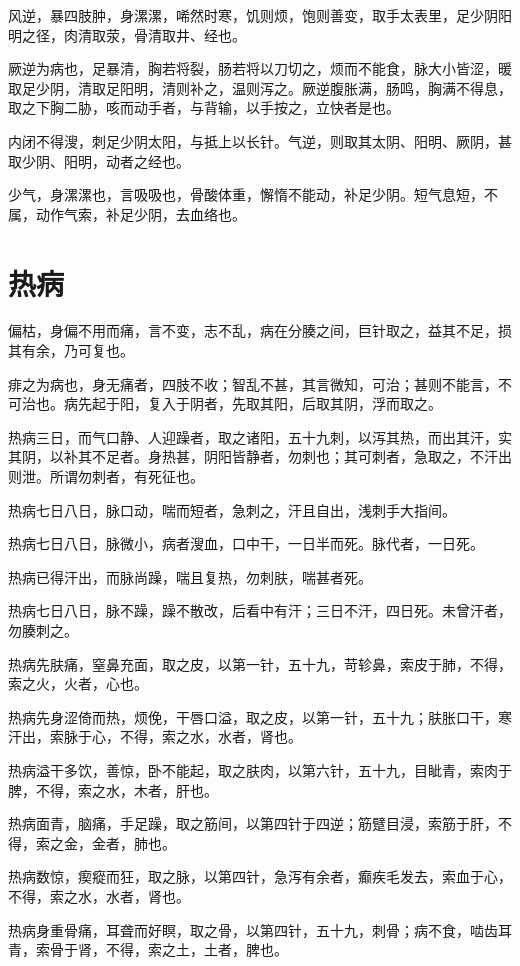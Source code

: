 \documentclass[12pt,UTF8]{ctexbook}
\begin{document}
	风逆，暴四肢肿，身漯漯，唏然时寒，饥则烦，饱则善变，取手太表里，足少阴阳明之径，肉清取荥，骨清取井、经也。
	
	厥逆为病也，足暴清，胸若将裂，肠若将以刀切之，烦而不能食，脉大小皆涩，暖取足少阴，清取足阳明，清则补之，温则泻之。厥逆腹胀满，肠鸣，胸满不得息，取之下胸二胁，咳而动手者，与背输，以手按之，立快者是也。
	
	内闭不得溲，刺足少阴太阳，与抵上以长针。气逆，则取其太阴、阳明、厥阴，甚取少阴、阳明，动者之经也。
	
	少气，身漯漯也，言吸吸也，骨酸体重，懈惰不能动，补足少阴。短气息短，不属，动作气索，补足少阴，去血络也。
	\chapter{热病}
	
	偏枯，身偏不用而痛，言不变，志不乱，病在分腠之间，巨针取之，益其不足，损其有余，乃可复也。
	
	痱之为病也，身无痛者，四肢不收；智乱不甚，其言微知，可治；甚则不能言，不可治也。病先起于阳，复入于阴者，先取其阳，后取其阴，浮而取之。
	
	热病三日，而气口静、人迎躁者，取之诸阳，五十九刺，以泻其热，而出其汗，实其阴，以补其不足者。身热甚，阴阳皆静者，勿刺也；其可刺者，急取之，不汗出则泄。所谓勿刺者，有死征也。
	
	热病七日八日，脉口动，喘而短者，急刺之，汗且自出，浅刺手大指间。
	
	热病七日八日，脉微小，病者溲血，口中干，一日半而死。脉代者，一日死。
	
	热病已得汗出，而脉尚躁，喘且复热，勿刺肤，喘甚者死。
	
	热病七日八日，脉不躁，躁不散改，后看中有汗；三日不汗，四日死。未曾汗者，勿腠刺之。
	
	热病先肤痛，窒鼻充面，取之皮，以第一针，五十九，苛轸鼻，索皮于肺，不得，索之火，火者，心也。
	
	热病先身涩倚而热，烦俛，干唇口溢，取之皮，以第一针，五十九；肤胀口干，寒汗出，索脉于心，不得，索之水，水者，肾也。
	
	热病溢干多饮，善惊，卧不能起，取之肤肉，以第六针，五十九，目眦青，索肉于脾，不得，索之水，木者，肝也。
	
	热病面青，脑痛，手足躁，取之筋间，以第四针于四逆；筋躄目浸，索筋于肝，不得，索之金，金者，肺也。
	
	热病数惊，瘈瘲而狂，取之脉，以第四针，急泻有余者，癫疾毛发去，索血于心，不得，索之水，水者，肾也。
	
	热病身重骨痛，耳聋而好瞑，取之骨，以第四针，五十九，刺骨；病不食，啮齿耳青，索骨于肾，不得，索之土，土者，脾也。
	
\end{document}
